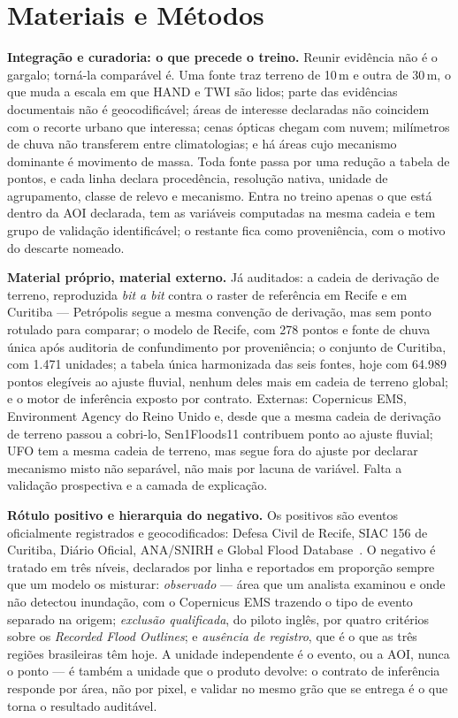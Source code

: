 \documentclass[conference]{IEEEtran}
\begin{document}
\section{Materiais e Métodos}

\textbf{Integração e curadoria: o que precede o treino.} Reunir evidência não é o
gargalo; torná-la comparável é. Uma fonte traz terreno de 10\,m e outra de 30\,m,
o que muda a escala em que HAND e TWI são lidos; parte das evidências documentais
não é geocodificável; áreas de interesse declaradas não coincidem com o recorte
urbano que interessa; cenas ópticas chegam com nuvem; milímetros de chuva não
transferem entre climatologias; e há áreas cujo mecanismo dominante é movimento
de massa. Toda fonte passa por uma
redução a tabela de pontos, e cada linha declara procedência, resolução nativa,
unidade de agrupamento, classe de relevo e mecanismo. Entra no treino apenas o
que está dentro da AOI declarada, tem as variáveis computadas na mesma cadeia e
tem grupo de validação identificável; o restante fica como proveniência, com o
motivo do descarte nomeado.

\textbf{Material próprio, material externo.} Já auditados: a cadeia de derivação
de terreno, reproduzida \emph{bit a bit} contra o raster de referência em Recife
e em Curitiba --- Petrópolis segue a mesma convenção de derivação, mas sem ponto
rotulado para comparar; o modelo de Recife, com 278 pontos e fonte de chuva
única após auditoria de confundimento por proveniência; o conjunto de
Curitiba, com 1.471 unidades; a tabela única harmonizada das seis fontes, hoje
com 64.989 pontos elegíveis ao ajuste fluvial, nenhum deles mais em cadeia de
terreno global; e o motor de inferência exposto por contrato. Externas:
Copernicus EMS, Environment Agency do Reino Unido e, desde que a mesma cadeia
de derivação de terreno passou a cobri-lo, Sen1Floods11 contribuem ponto ao
ajuste fluvial; UFO tem a mesma cadeia de terreno, mas segue fora do ajuste
por declarar mecanismo misto não separável, não mais por lacuna de variável.
Falta a validação prospectiva e a camada de explicação.

\textbf{Rótulo positivo e hierarquia do negativo.} Os positivos são eventos
oficialmente registrados e geocodificados: Defesa Civil de Recife, SIAC 156 de
Curitiba, Diário Oficial, ANA/SNIRH e Global Flood Database~\cite{tellman2021}. O
negativo é tratado em três níveis, declarados por linha e reportados em proporção
sempre que um modelo os misturar: \emph{observado} --- área que um analista
examinou e onde não detectou inundação, com o Copernicus EMS trazendo o tipo de
evento separado na origem; \emph{exclusão qualificada}, do piloto inglês, por
quatro critérios sobre os \emph{Recorded Flood Outlines}; e \emph{ausência de
registro}, que é o que as três regiões brasileiras têm hoje. A unidade
independente é o evento, ou a AOI, nunca o ponto --- é também a unidade que o
produto devolve: o contrato de inferência responde por área, não por pixel, e
validar no mesmo grão que se entrega é o que torna o resultado auditável.
\end{document}
